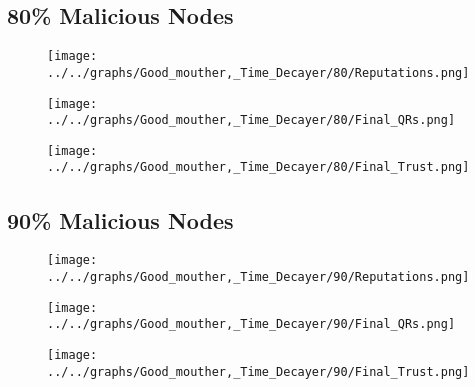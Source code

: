 \begin{minipage}[t]{0.49\columnwidth}
\subsection*{80\% Malicious Nodes}
    \begin{figure}[H]
        \centering
        \texttt{[image: ../../graphs/Good\_mouther,\_Time\_Decayer/80/Reputations.png]}
    \end{figure}
    \begin{figure}[H]
        \centering
        \texttt{[image: ../../graphs/Good\_mouther,\_Time\_Decayer/80/Final\_QRs.png]}
    \end{figure}
\end{minipage}
\begin{minipage}[t]{0.49\columnwidth}
    \begin{figure}[H]
        \centering
        \texttt{[image: ../../graphs/Good\_mouther,\_Time\_Decayer/80/Final\_Trust.png]}
    \end{figure}
\end{minipage}

\begin{minipage}[t]{0.49\columnwidth}
\subsection*{90\% Malicious Nodes}
    \begin{figure}[H]
        \centering
        \texttt{[image: ../../graphs/Good\_mouther,\_Time\_Decayer/90/Reputations.png]}
    \end{figure}
    \begin{figure}[H]
        \centering
        \texttt{[image: ../../graphs/Good\_mouther,\_Time\_Decayer/90/Final\_QRs.png]}
    \end{figure}
\end{minipage}
\begin{minipage}[t]{0.49\columnwidth}
    \begin{figure}[H]
        \centering
        \texttt{[image: ../../graphs/Good\_mouther,\_Time\_Decayer/90/Final\_Trust.png]}
    \end{figure}
\end{minipage}
\newpage

